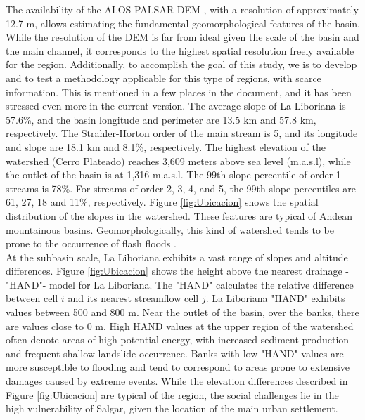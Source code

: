 \documentclass[hess, manuscript]{copernicus}
\begin{document}
The availability of the ALOS-PALSAR DEM \citep{ALOS}, with a resolution of approximately 12.7 m, allows estimating the fundamental geomorphological features of the basin. While the resolution of the DEM is far from ideal given the scale of the basin and the main channel, it corresponds to the highest spatial resolution freely available for the region.
Additionally, to accomplish the goal of this study, we is to develop and to test a methodology applicable for this type of regions, with scarce information. This is mentioned in a few places in the document, and it has been stressed even more in the current version. The average slope of La Liboriana is 57.6\%, and the basin longitude and perimeter are 13.5 $\text{km}$ and 57.8 $\text{km}$, respectively.  The Strahler-Horton order of the main stream is 5, and its longitude and slope are 18.1 $\text{km}$ and 8.1\%, respectively. The highest elevation of the watershed (Cerro Plateado) reaches 3,609 meters above sea level (m.a.s.l), while the outlet of the basin is at 1,316 m.a.s.l. The 99th slope percentile of order 1 streams is 78\%. For streams of order 2, 3, 4, and 5, the 99th slope percentiles are 61, 27, 18 and 11\%, respectively. Figure \ref{fig:Ubicacion} shows the spatial distribution of the slopes in the watershed. These features are typical of Andean mountainous basins. Geomorphologically, this kind of watershed tends to be prone to the occurrence of flash floods \citep{Lehmann2012, Penna2011, Martin2018,Longoni2016, Ozturk2018, Khosravi2018, Marchi2016, Bisht2018}.\\


At the subbasin scale, La Liboriana exhibits a vast range of slopes and altitude differences. Figure \ref{fig:Ubicacion} shows the height above the nearest drainage -"HAND"- model   \citep{Renno2008} for La Liboriana. The "HAND" calculates the relative difference between cell $i$ and its nearest streamflow cell $j$. La Liboriana "HAND" exhibits values between 500 and 800 $\text{m}$. Near the outlet of the basin, over the banks, there are values close to 0 m. High HAND values at the upper region of the watershed often denote areas of high potential energy, with increased sediment production and frequent shallow landslide occurrence. Banks with low "HAND" values are more susceptible to flooding and tend to correspond to areas prone to extensive damages caused by extreme events. While the elevation differences described in Figure \ref{fig:Ubicacion} are typical of the region, the social challenges lie in the high vulnerability of Salgar, given the location of the main urban settlement.\\ 
\end{document}
